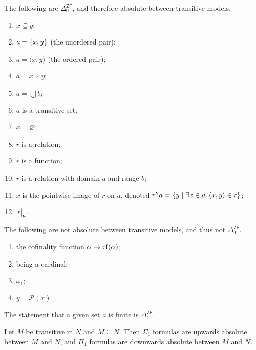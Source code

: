 \begin{proposition}
    The following are \( \Delta_0^{\mathsf{ZF}} \), and therefore absolute between transitive models.
    \begin{enumerate}
        \item \( x \subseteq y \);
        \item \( a = \qty{x, y} \) (the unordered pair);
        \item \( a = \langle x, y \rangle \) (the ordered pair);
        \item \( a = x \times y \);
        \item \( a = \bigcup b \);
        \item \( a \) is a transitive set;
        \item \( x = \varnothing \);
        \item \( r \) is a relation;
        \item \( r \) is a function;
        \item \( r \) is a relation with domain \( a \) and range \( b \);
        \item \( x \) is the pointwise image of \( r \) on \( a \), denoted \( r '' a = \qty{y \mid \exists x \in a.\, \langle x, y \rangle \in r} \);
        \item \( \eval{r}_a \).
    \end{enumerate}
\end{proposition}
\begin{remark}
    The following are not absolute between transitive models, and thus not \( \Delta_0^{\mathsf{ZF}} \).
    \begin{enumerate}
        \item the cofinality function \( \alpha \mapsto \operatorname{cf}(\alpha) \);
        \item being a cardinal;
        \item \( \omega_1 \);
        \item \( y = \mathcal P(x) \).
    \end{enumerate}
\end{remark}
\begin{lemma}
    The statement that a given set \( a \) is finite is \( \Delta_1^{\mathsf{ZF}} \).
\end{lemma}
\begin{proposition}
    Let \( M \) be transitive in \( N \) and \( M \subseteq N \).
    Then \( \Sigma_1 \) formulas are upwards absolute between \( M \) and \( N \), and \( \Pi_1 \) formulas are downwards absolute between \( M \) and \( N \).
\end{proposition}

